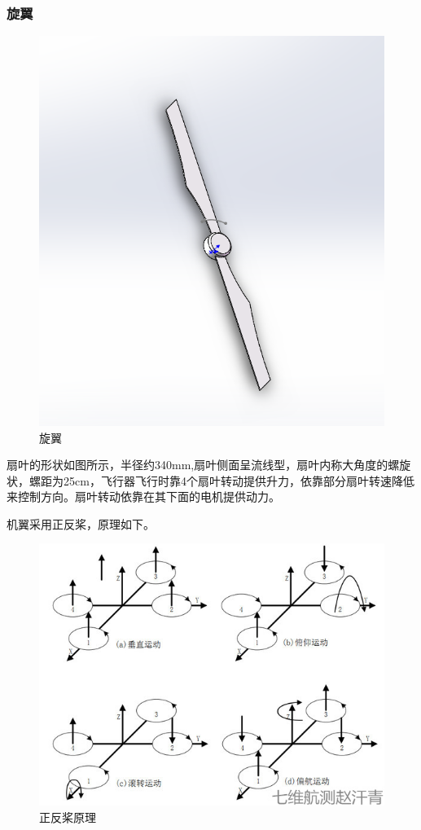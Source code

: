 \documentclass{ctexart}
\begin{document}
\subsubsection{旋翼}
\begin{figure}[H]
\centering
    \includegraphics[width = \textwidth]{009}
    \caption{旋翼}\par
\end{figure}
扇叶的形状如图所示，半径约340mm,扇叶侧面呈流线型，扇叶内称大角度的螺旋状，螺距为25cm，飞行器飞行时靠4个扇叶转动提供升力，依靠部分扇叶转速降低来控制方向。扇叶转动依靠在其下面的电机提供动力。\par
机翼采用正反桨，原理如下。\par
\begin{figure}[H]
\centering
    \includegraphics[width = \textwidth]{010}
    \caption{正反桨原理}\par
\end{figure}
\end{document}
